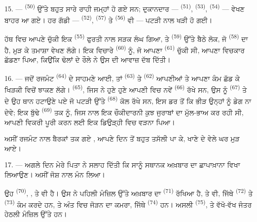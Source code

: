 15. ---  \textsuperscript{(50)} ਉੱਤੇ ਬਹੁਤ ਸਾਰੇ ਰਾਹੀ ਜਮ੍ਹਾਂ ਹੋ ਗਏ ਸਨ;
ਦੁਕਾਨਦਾਰ —  \textsuperscript{(51)}, 
\textsuperscript{(53)},  \textsuperscript{(54)} — 
ਵੇਖਣ ਬਾਹਰ ਆ ਗਏ। ਹਰ ਗੱਡੀ —  \textsuperscript{(52)},
 \textsuperscript{(57)} ਤੇ 
\textsuperscript{(56)} ਵੀ — ਪਟੜੀ ਨਾਲ ਖੜੀ ਹੋ ਗਈ।

\VUsaut{3.0mm}

ਹੱਥ ਵਿਚ ਆਪਣੇ  ਚੁੱਕੀ ਇਕ 
\textsuperscript{(55)} ਫੁਰਤੀ ਨਾਲ ਸੜਕ ਲੰਘ ਗਿਆ, ਤੇ 
\textsuperscript{(59)} ਉੱਤੇ ਬੈਠੇ ਲੋਕ, ਜੋ  \textsuperscript{(58)} ਦਾ
ਹੈ, ਮੁੜ ਕੇ ਤਮਾਸ਼ਾ ਵੇਖਣ ਲੱਗੇ। ਇਕ ਵਿਚਾਰੇ 
\textsuperscript{(60)} ਨੂੰ, ਜੋ ਆਪਣਾ  \textsuperscript{(61)} ਚੁੱਕੀ
ਸੀ, ਆਪਣਾ  ਵਿਚਕਾਰ ਛੱਡਣਾ ਪਿਆ, ਕਿਉਂਕਿ ਢੋਲਾਂ ਦੇ ਰੌਲੇ ਨੇ ਉਸ ਦੀ ਆਵਾਜ਼ ਦੱਬ
ਦਿੱਤੀ।

16. --- ਜਦੋਂ ਰਜਮੰਟ  \textsuperscript{(64)} ਦੇ ਸਾਹਮਣੇ ਆਈ, ਤਾਂ
 \textsuperscript{(63)} ਤੇ 
\textsuperscript{(62)} ਆਪਣੀਆਂ  ਤੇ ਆਪਣਾ ਕੰਮ ਛੱਡ ਕੇ ਖਿੜਕੀ
ਵਿਚੋਂ ਝਾਕਣ ਲੱਗੇ।  \textsuperscript{(65)}, ਜਿਸ ਨੇ ਹੁਣੇ ਹੁਣੇ ਆਪਣੀ
 ਵਿਚ ਨਵੇਂ  \textsuperscript{(66)} ਰੱਖੇ ਸਨ, ਉਸ
ਨੂੰ  \textsuperscript{(67)} ਤੇ  ਦੇ ਉਹ ਥਾਨ ਹਟਾਉਣੇ ਪਏ ਜੋ
ਪਟੜੀ ਉੱਤੇ  \textsuperscript{(68)} ਕੋਲ ਰੱਖੇ ਸਨ, ਇਸ ਡਰ ਤੋਂ ਕਿ ਭੀੜ
ਉਨ੍ਹਾਂ ਨੂੰ ਡੇਗ ਨਾ ਦੇਵੇ; ਇਕ ਬੁੱਢੇ  \textsuperscript{(69)} ਤਕ ਨੂੰ,
ਜਿਸ ਨਾਲ ਇਕ ਚੌਕੀਦਾਰਨੀ ਕੁਝ ਜੁਰਾਬਾਂ ਦਾ ਮੁੱਲ-ਭਾਅ ਕਰ ਰਹੀ ਸੀ, ਆਪਣੀ ਵਿਕਰੀ ਪੂਰੀ ਕਰਨ ਲਈ ਇਕ
ਡਿਉੜ੍ਹੀ ਵਿਚ ਵੜਨਾ ਪਿਆ।

ਅਸੀਂ ਰਜਮੰਟ ਨਾਲ ਬੈਰਕਾਂ ਤਕ ਗਏ , ਆਪਣੇ ਦਿਨ ਤੋਂ ਬਹੁਤ ਤਸੱਲੀ ਪਾ ਕੇ, ਖਾਣੇ ਦੇ
ਵੇਲੇ ਘਰ ਮੁੜ ਆਏ।

\VUsaut{3.0mm}

17. --- ਅਗਲੇ ਦਿਨ ਮੇਰੇ ਪਿਤਾ ਨੇ ਸਲਾਹ ਦਿੱਤੀ ਕਿ ਸਾਨੂੰ ਸਥਾਨਕ ਅਖ਼ਬਾਰ ਦਾ ਛਾਪਾਖ਼ਾਨਾ ਵਿਖਾ
ਲਿਆਉਣ। ਅਸੀਂ ਜੋਸ਼ ਨਾਲ ਮੰਨ ਲਿਆ।

ਉਹ   \textsuperscript{(70)},
,  ਤੇ  ਵੀ
ਹੈ। ਉਸ ਨੇ ਪਹਿਲੀ ਮੰਜ਼ਿਲ ਉੱਤੇ ਅਖ਼ਬਾਰ ਦਾ  \textsuperscript{(71)}
ਰੱਖਿਆ ਹੈ, ਤੇ  ਵੀ, ਜਿੱਥੇ 
\textsuperscript{(72)} ਤੇ  \textsuperscript{(73)} ਕੰਮ ਕਰਦੇ
ਹਨ, ਤੇ ਅੰਤ ਵਿਚ ਜੋੜਨ ਦਾ ਕਮਰਾ, ਜਿੱਥੇ  \textsuperscript{(74)}
ਹਨ। ਅਸਲੀ  \textsuperscript{(75)},  ਤੇ
ਵੱਖੋ-ਵੱਖ ਜੰਤਰ ਹੇਠਲੀ ਮੰਜ਼ਿਲ ਉੱਤੇ ਹਨ।

